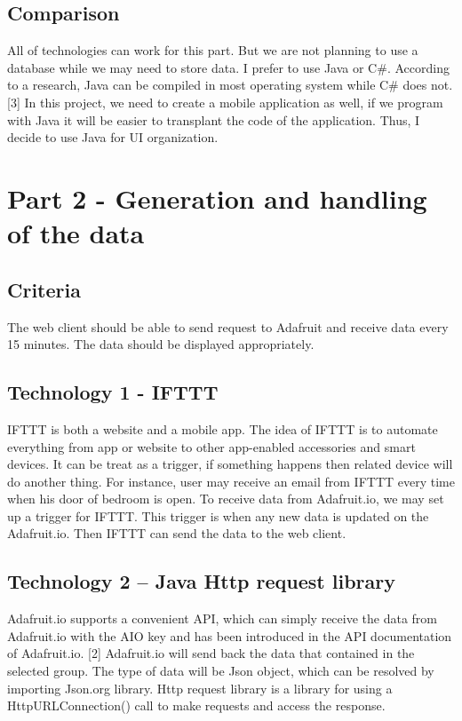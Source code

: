 \documentclass[10pt,onecolumn,journal,draftclsnofoot]{IEEEtran}
\begin{document}
    \subsection{Comparison}
    \par 
    All of technologies can work for this part. But we are not planning to use a database while we may need to store data. I prefer to use Java or C\#. According to a research, Java can be compiled in most operating system while C\# does not. [3] In this project, we need to create a mobile application as well, if we program with Java it will be easier to transplant the code of the application. Thus, I decide to use Java for UI organization.

	\section{Part 2 - Generation and handling of the data}
	\subsection{Criteria}
	\par The web client should be able to send request to Adafruit and receive data every 15 minutes. The data should be displayed appropriately.
	
	\subsection{Technology 1 - IFTTT}
	\par
	IFTTT is both a website and a mobile app. The idea of IFTTT is to automate everything from app or website to other app-enabled accessories and smart devices. It can be treat as a trigger, if something happens then related device will do another thing. For instance, user may receive an email from IFTTT every time when his door of bedroom is open. To receive data from Adafruit.io, we may set up a trigger for IFTTT. This trigger is when any new data is updated on the Adafruit.io. Then IFTTT can send the data to the web client.
    \subsection{Technology 2 – Java Http request library  }
	\par 
	Adafruit.io supports a convenient API, which can simply receive the data from Adafruit.io with the AIO key and has been introduced in the API documentation of Adafruit.io. [2] Adafruit.io will send back the data that contained in the selected group. The type of data will be Json object, which can be resolved by importing Json.org library. Http request library is a library for using a HttpURLConnection() call to make requests and access the response. 
\end{document}
